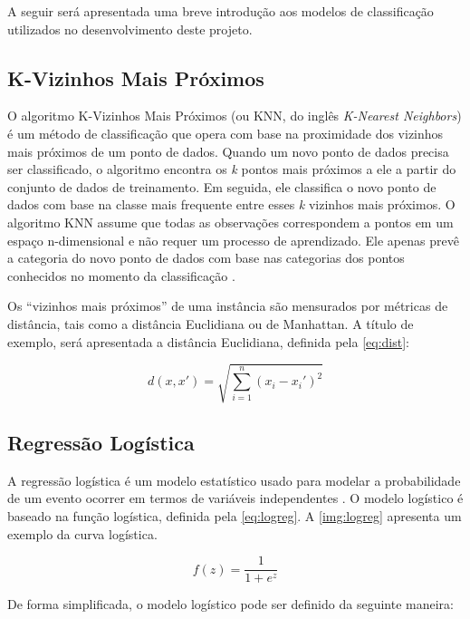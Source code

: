 A seguir será apresentada uma breve introdução aos modelos de classificação utilizados no desenvolvimento deste projeto.

\subsection{K-Vizinhos Mais Próximos}

O algoritmo K-Vizinhos Mais Próximos (ou KNN, do inglês \textit{K-Nearest Neighbors}) é um método de classificação que opera com base na proximidade dos vizinhos mais próximos de um ponto de dados. Quando um novo ponto de dados precisa ser classificado, o algoritmo encontra os \textit{k} pontos mais próximos a ele a partir do conjunto de dados de treinamento. Em seguida, ele classifica o novo ponto de dados com base na classe mais frequente entre esses \textit{k} vizinhos mais próximos.
O algoritmo KNN assume que todas as observações correspondem a pontos em um espaço n-dimensional e não requer um processo de aprendizado. Ele apenas prevê a categoria do novo ponto de dados com base nas categorias dos pontos conhecidos no momento da classificação \cite{Wang_2019}.

Os “vizinhos mais próximos” de uma instância são mensurados por métricas de distância, tais como a distância Euclidiana ou de Manhattan. A título de exemplo, será apresentada a distância Euclidiana, definida pela \autoref{eq:dist}:

\begin{equation}
\label{eq:dist}
    d(x, x') = \sqrt{\sum_{i=1}^{n} (x_i - x_i')^2} 
\end{equation}

\subsection{Regress\~ao Logística}

A regressão logística é um modelo estatístico usado para modelar a probabilidade de um evento ocorrer em termos de variáveis independentes \cite{logreg}. O modelo logístico é baseado na função logística, definida pela \autoref{eq:logreg}. A \autoref{img:logreg} apresenta um exemplo da curva logística.

\begin{equation}
    \label{eq:logreg}
    f(z) = \frac{1}{1 + e^z}
\end{equation}

De forma simplificada, o modelo logístico pode ser definido da seguinte maneira:

